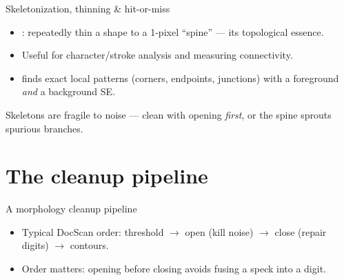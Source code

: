 \documentclass[10pt,aspectratio=169]{beamer}
\begin{document}
\begin{frame}{Skeletonization, thinning \& hit-or-miss}
  \begin{itemize}
    \item {}: repeatedly thin a shape to a 1-pixel ``spine'' — its topological essence.
    \item Useful for character/stroke analysis and measuring connectivity.
    \item {} finds exact local patterns (corners, endpoints, junctions) with a foreground \emph{and} a background SE.
  \end{itemize}
  \begin{infobox}
    Skeletons are fragile to noise — clean with opening \emph{first}, or the spine sprouts spurious branches.
  \end{infobox}
\end{frame}

\section{The cleanup pipeline}

\begin{frame}{A morphology cleanup pipeline}
  \begin{center}
  \end{center}
  \begin{itemize}
    \item Typical DocScan order: threshold $\rightarrow$ open (kill noise) $\rightarrow$ close (repair digits) $\rightarrow$ contours.
    \item Order matters: opening before closing avoids fusing a speck into a digit.
  \end{itemize}
\end{frame}
\end{document}
